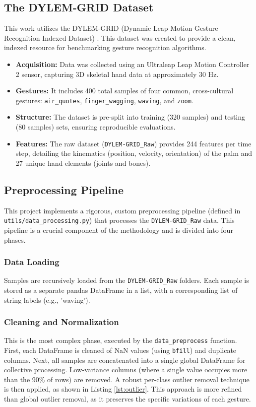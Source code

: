 \documentclass[]{IEEEphot}
\begin{document}
\subsection{The DYLEM-GRID Dataset}
This work utilizes the DYLEM-GRID (Dynamic Leap Motion Gesture Recognition Indexed Dataset) \cite{dylem2024}. This dataset was created to provide a clean, indexed resource for benchmarking gesture recognition algorithms.
\begin{itemize}
    \item \textbf{Acquisition:} Data was collected using an Ultraleap Leap Motion Controller 2 sensor, capturing 3D skeletal hand data at approximately 30 Hz.
    \item \textbf{Gestures:} It includes 400 total samples of four common, cross-cultural gestures: \texttt{air\_quotes}, \texttt{finger\_wagging}, \texttt{waving}, and \texttt{zoom}.
    \item \textbf{Structure:} The dataset is pre-split into training (320 samples) and testing (80 samples) sets, ensuring reproducible evaluations.
    \item \textbf{Features:} The raw dataset (\texttt{DYLEM-GRID\_Raw}) provides 244 features per time step, detailing the kinematics (position, velocity, orientation) of the palm and 27 unique hand elements (joints and bones).
\end{itemize}

\subsection{Preprocessing Pipeline}
This project implements a rigorous, custom preprocessing pipeline (defined in \texttt{utils/data\_processing.py}) that processes the \texttt{DYLEM-GRID\_Raw} data. This pipeline is a crucial component of the methodology and is divided into four phases.

\subsubsection{Data Loading}
Samples are recursively loaded from the \texttt{DYLEM-GRID\_Raw} folders. Each sample is stored as a separate pandas DataFrame in a list, with a corresponding list of string labels (e.g., 'waving').

\subsubsection{Cleaning and Normalization}
This is the most complex phase, executed by the \texttt{data\_preprocess} function.
First, each DataFrame is cleaned of NaN values (using \texttt{bfill}) and duplicate columns.
Next, all samples are concatenated into a single global DataFrame for collective processing. Low-variance columns (where a single value occupies more than the 90\% of rows) are removed.
A robust per-class outlier removal technique is then applied, as shown in Listing \ref{lst:outlier}. This approach is more refined than global outlier removal, as it preserves the specific variations of each gesture.
\end{document}
